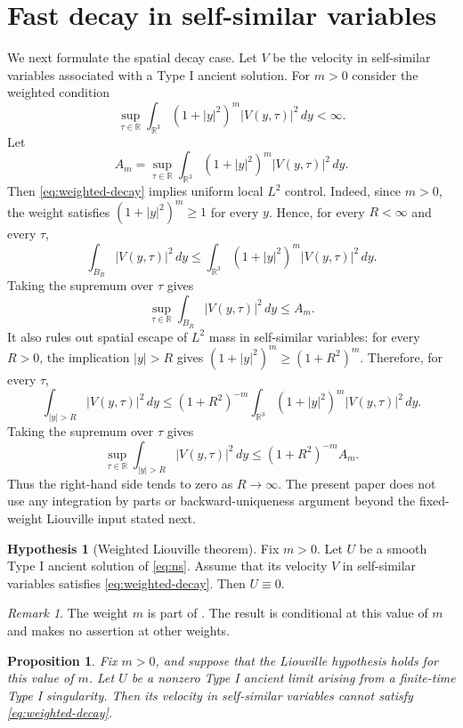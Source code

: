 \documentclass[11pt]{amsart}
\theoremstyle{plain}
\newtheorem{proposition}[theorem]{Proposition}
\theoremstyle{definition}
\newtheorem{hypothesis}[theorem]{Hypothesis}
\theoremstyle{remark}
\newtheorem{remark}[theorem]{Remark}
\numberwithin{equation}{section}
\begin{document}
\section{Fast decay in self-similar variables}

We next formulate the spatial decay case.  Let \(V\) be the velocity in
self-similar variables associated with a Type I ancient solution.  For \(m>0\)
consider the weighted condition
\begin{equation}\label{eq:weighted-decay}
\sup_{\tau\in\mathbb R}
\int_{\mathbb R^3}(1+|y|^2)^m |V(y,\tau)|^2\,dy<\infty .
\end{equation}
Let
\[
   A_m=\sup_{\tau\in\mathbb R}
   \int_{\mathbb R^3}(1+|y|^2)^m |V(y,\tau)|^2\,dy .
\]
Then \eqref{eq:weighted-decay} implies uniform local \(L^2\) control.  Indeed,
since \(m>0\), the weight satisfies
\((1+|y|^2)^m\ge1\) for every \(y\).  Hence, for every \(R<\infty\) and every
\(\tau\),
\[
   \int_{B_R}|V(y,\tau)|^2\,dy
   \le
   \int_{\mathbb R^3}(1+|y|^2)^m |V(y,\tau)|^2\,dy .
\]
Taking the supremum over \(\tau\) gives
\[
   \sup_{\tau\in\mathbb R}\int_{B_R}|V(y,\tau)|^2\,dy
   \le A_m .
\]
It also rules out spatial escape of \(L^2\) mass in self-similar variables:
for every \(R>0\), the implication \(|y|>R\) gives
\((1+|y|^2)^m\ge(1+R^2)^m\).  Therefore, for every \(\tau\),
\[
   \int_{|y|>R}|V(y,\tau)|^2\,dy
   \le
   (1+R^2)^{-m}
   \int_{\mathbb R^3}(1+|y|^2)^m |V(y,\tau)|^2\,dy .
\]
Taking the supremum over \(\tau\) gives
\[
   \sup_{\tau\in\mathbb R}\int_{|y|>R}|V(y,\tau)|^2\,dy
   \le (1+R^2)^{-m}A_m .
\]
Thus the right-hand side tends to zero as \(R\to\infty\).  The present paper
does not use any integration by parts or backward-uniqueness argument beyond
the fixed-weight Liouville input stated next.

\begin{hypothesis}[Weighted Liouville theorem]\label{hyp:weighted}
Fix \(m>0\).  Let \(U\) be a smooth Type I ancient solution of \eqref{eq:ns}.
Assume that its velocity \(V\) in self-similar variables satisfies
\eqref{eq:weighted-decay}.  Then \(U\equiv0\).
\end{hypothesis}

\begin{remark}\label{rem:weighted-exponent}
The weight \(m\) is part of .  The result is conditional at
this value of \(m\) and makes no assertion at other weights.
\end{remark}

\begin{proposition}\label{prop:weighted-exclusion}
Fix \(m>0\), and suppose that the Liouville hypothesis 
holds for this value of \(m\).  Let \(U\) be a nonzero Type I ancient limit
arising from a finite-time Type I singularity.  Then its velocity in
self-similar variables cannot satisfy \eqref{eq:weighted-decay}.
\end{proposition}
\end{document}
